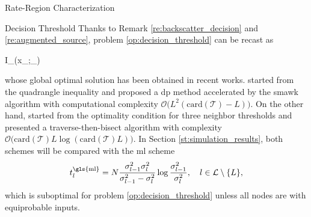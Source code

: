 \documentclass[journal]{IEEEtran}
\begin{document}
\begin{section}{Rate-Region Characterization}
\begin{subsection}{Decision Threshold}
		Thanks to Remark \ref{re:backscatter_decision} and \ref{re:augmented_source}, problem \eqref{op:decision_threshold} can be recast as
		\begin{maxi!}
			{}{I_{}(x_{};_{})}{\label{op:decision_threshold_discrete}}{\label{ob:decision_threshold_discrete}}
			\addConstraint{\eqref{co:sequential_threshold},}
		\end{maxi!}
		whose global optimal solution has been obtained in recent works.
		\cite{He2021} started from the quadrangle inequality and proposed a \gls{dp} method accelerated by the \gls{smawk} algorithm with computational complexity $\mathcal{O}\bigl(L^2(\mathrm{card}(\mathcal{T})-L)\bigr)$.
		On the other hand, \cite{Nguyen2020a} started from the optimality condition for three neighbor thresholds and presented a traverse-then-bisect algorithm with complexity $\mathcal{O}\bigl(\mathrm{card}(\mathcal{T})L\log(\mathrm{card}(\mathcal{T})L)\bigr)$.
		In Section \ref{st:simulation_results}, both schemes will be compared with the \gls{ml} scheme \cite{Qian2019}
		\begin{equation}
			t_{l}^{\text{\gls{ml}}} = N \frac{\sigma_{l-1}^2 \sigma_{l}^2}{\sigma_{l-1}^2 - \sigma_{l}^2} \log \frac{\sigma_{l-1}^2}{\sigma_{l}^2}, \quad l \in \mathcal{L} \setminus \{L\},
			\label{eq:detection_threshold_ml}
		\end{equation}
		which is suboptimal for problem \eqref{op:decision_threshold} unless all nodes are with equiprobable inputs.
	\end{subsection}
\end{section}
\end{document}
